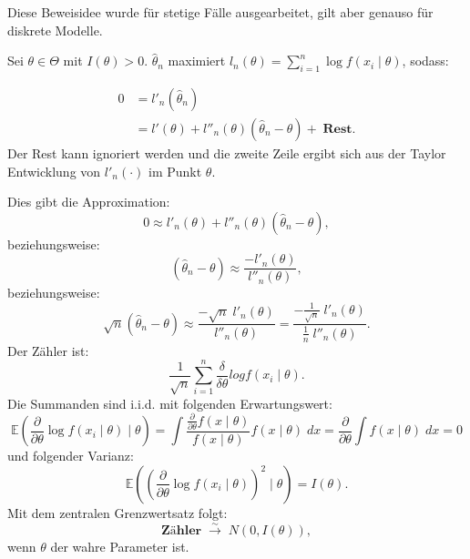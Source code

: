 \documentclass[10pt]{article}
\newcommand{\EW}{\mathbb{E}} %
\newcommand{\KV}{\overset{\sim} \longrightarrow} %
\newcommand{\xt}{x \mid \theta} %
\newcommand{\ablt}{\frac{\partial}{\partial \theta}}
\newenvironment{BWS}[1][]
{\begin{Beweis}[frametitle=#1]}{\end{Beweis}}
\begin{document}
	\begin{BWS}[Beweisidee 1.3.6 (Verteilung des Schätzfehlers)]
		Diese Beweisidee wurde für stetige Fälle ausgearbeitet, gilt aber genauso für diskrete Modelle. 
		
		Sei $\theta \in \Theta$ mit $I(\theta) > 0$. $\hat{\theta}_n$ maximiert $l_n (\theta) = \sum_{i=1}^{n} \log f (x_i \mid \theta)$, sodass:
		
		\begin{equation*}
			\begin{split}
				0 &= l'_n (\hat{\theta}_n) \\
				&= l'(\theta) + l''_n(\theta) (\hat{\theta}_n - \theta) + \; \textbf{Rest}.
			\end{split}
		\end{equation*}
		Der Rest kann ignoriert werden und die zweite Zeile ergibt sich aus der Taylor Entwicklung von $l'_{n}(\cdot)$ im Punkt $\theta$. 
		
		Dies gibt die Approximation:
		\begin{equation*}
			0 \approx l'_n (\theta) +  l''_n(\theta) (\hat{\theta}_n - \theta),
		\end{equation*}
		beziehungsweise:
		\begin{equation*}
			(\hat{\theta}_n - \theta) \approx \frac{-l'_n (\theta)}{l''_n(\theta)},
		\end{equation*}
		beziehungsweise:
		\begin{equation*}
			\sqrt{n} (\hat{\theta}_n - \theta) \approx \frac{-\sqrt{n}\;l'_n(\theta)}{l''_n(\theta)} = \frac{-\frac{1}{\sqrt{n} } \; l'_n(\theta)}{\frac{1}{n}\;l''_n(\theta)}.
		\end{equation*}
		Der Zähler ist:
		\begin{equation*}
			\frac{1}{\sqrt{n}}\sum_{i=1}^{n} \frac{\delta}{\delta \theta} log f(x_i \mid \theta).
		\end{equation*}
		Die Summanden sind i.i.d. mit folgenden Erwartungswert:
		\begin{equation*}
			\EW\left(\ablt \log f(x_i \mid \theta) \mid \theta\right) = \int \frac{\ablt f(x \mid \theta)}{f(\xt)} f(\xt) \; dx = \ablt \int f(\xt) \; dx = 0
		\end{equation*}
		und folgender Varianz:
		\begin{equation*}
			\EW(\left(\ablt \log f(x_i \mid \theta)\right)^2 \mid \theta) = I(\theta).
		\end{equation*}
		Mit dem zentralen Grenzwertsatz folgt:
		\begin{equation*}
			\textbf{Zähler} \; \KV \; N(0,I(\theta)),
		\end{equation*}
		wenn $\theta$ der wahre Parameter ist.
		

\end{BWS}
\end{document}

